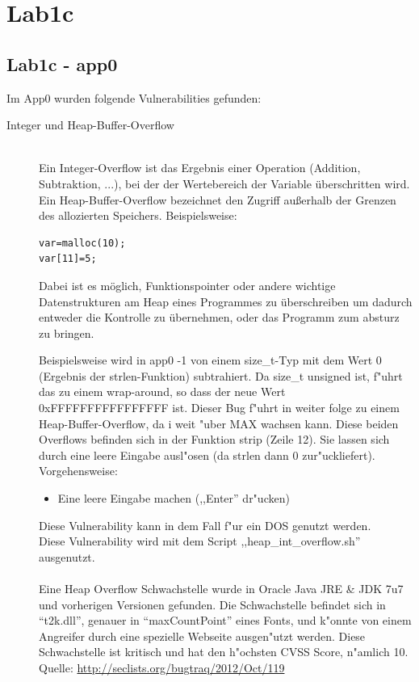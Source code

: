 \documentclass[12pt,a4paper,titlepage,oneside]{scrartcl}
\begin{document}
\section{Lab1c} 
\subsection{Lab1c - app0}
Im App0 wurden folgende Vulnerabilities gefunden:
\begin{description}
  \item[Integer und Heap-Buffer-Overflow] \hfill \\
  	 Ein Integer-Overflow ist das Ergebnis einer Operation (Addition, Subtraktion, ...), bei der der Wertebereich der Variable überschritten wird.\newline
  	 Ein Heap-Buffer-Overflow bezeichnet den Zugriff außerhalb der Grenzen des allozierten Speichers. Beispielsweise:
  	 \begin{lstlisting}
var=malloc(10);
var[11]=5;
	\end{lstlisting}
	Dabei ist es möglich, Funktionspointer oder andere wichtige Datenstrukturen am Heap eines Programmes zu überschreiben um dadurch entweder die Kontrolle zu übernehmen, oder das Programm zum absturz zu bringen.\newline
	
  	 Beispielsweise wird in app0 -1 von einem size\_t-Typ mit dem Wert 0 (Ergebnis der strlen-Funktion) subtrahiert. Da size\_t unsigned ist, f"uhrt das zu einem wrap-around, so dass der neue Wert 0xFFFFFFFFFFFFFFFF ist. \newline
    Dieser Bug f"uhrt in weiter folge zu einem Heap-Buffer-Overflow, da i weit "uber MAX wachsen kann.\newline
    Diese beiden Overflows befinden sich in der Funktion strip (Zeile 12). Sie lassen sich durch eine leere Eingabe ausl"osen (da strlen dann 0 zur"uckliefert).\newline
    Vorgehensweise:
    \begin{itemize}
    \item Eine leere Eingabe machen (,,Enter'' dr"ucken)
    \end {itemize}
    Diese Vulnerability kann in dem Fall f"ur ein DOS genutzt werden.\\
    Diese Vulnerability wird mit dem Script ,,heap\_int\_overflow.sh'' ausgenutzt.\\
    \\
    Eine Heap Overflow Schwachstelle wurde in Oracle Java JRE \& JDK 7u7 und vorherigen Versionen gefunden. Die Schwachstelle befindet sich in ``t2k.dll'', genauer in ``maxCountPoint'' eines Fonts, und k"onnte von einem Angreifer durch eine spezielle Webseite ausgen"utzt werden. Diese Schwachstelle ist kritisch und hat den h"ochsten CVSS Score, n"amlich 10.\newline
    Quelle: \url{http://seclists.org/bugtraq/2012/Oct/119}
    

\end{description}
\end{document}
